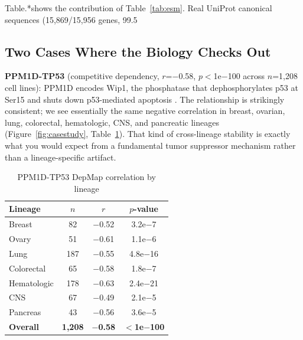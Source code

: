 \documentclass[12pt,a4paper]{article}
\begin{document}
Table.*shows the contribution of Table~\ref{tab:esm}. Real UniProt canonical sequences (15,869/15,956 genes, 99.5%

\subsection{Two Cases Where the Biology Checks Out}

\textbf{PPM1D-TP53} (competitive dependency, $r$=$-$0.58, $p$$<$1e$-$100 across $n$=1,208 cell lines): PPM1D encodes Wip1, the phosphatase that dephosphorylates p53 at Ser15 and shuts down p53-mediated apoptosis \cite{lu2005}. The relationship is strikingly consistent; we see essentially the same negative correlation in breast, ovarian, lung, colorectal, hematologic, CNS, and pancreatic lineages (Figure~\ref{fig:casestudy}, Table~\ref{tab:lineage}). That kind of cross-lineage stability is exactly what you would expect from a fundamental tumor suppressor mechanism rather than a lineage-specific artifact.

\begin{table}[ht]
\centering
\caption{PPM1D-TP53 DepMap correlation by lineage}
\label{tab:lineage}
\begin{tabular}{lccc}
\toprule
\textbf{Lineage} & \textbf{$n$} & \textbf{$r$} & \textbf{$p$-value} \\
\midrule
Breast & 82 & $-$0.52 & 3.2e$-$7 \\
Ovary & 51 & $-$0.61 & 1.1e$-$6 \\
Lung & 187 & $-$0.55 & 4.8e$-$16 \\
Colorectal & 65 & $-$0.58 & 1.8e$-$7 \\
Hematologic & 178 & $-$0.63 & 2.4e$-$21 \\
CNS & 67 & $-$0.49 & 2.1e$-$5 \\
Pancreas & 43 & $-$0.56 & 3.6e$-$5 \\
\midrule
\textbf{Overall} & \textbf{1,208} & \textbf{$-$0.58} & \textbf{${<}$1e$-$100} \\
\bottomrule
\end{tabular}
\end{table}
\end{document}
